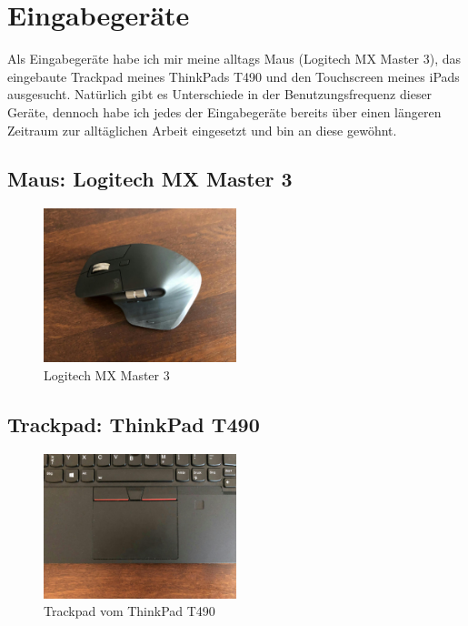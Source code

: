\documentclass{article}
\begin{document}
\newpage

\section{Eingabegeräte}

Als Eingabegeräte habe ich mir meine alltags Maus (Logitech MX Master 3), das
eingebaute Trackpad meines ThinkPads T490 und den Touchscreen meines iPads
ausgesucht. Natürlich gibt es Unterschiede in der Benutzungsfrequenz dieser
Geräte, dennoch habe ich jedes der Eingabegeräte bereits über einen längeren
Zeitraum zur alltäglichen Arbeit eingesetzt und bin an diese gewöhnt.

\subsection{Maus: Logitech MX Master 3}

\begin{figure}[h!]
	\centering
	\includegraphics[width=0.5\textwidth]{maus.jpg}
	\caption{Logitech MX Master 3}
\end{figure}

\subsection{Trackpad: ThinkPad T490}

\begin{figure}[h!]
	\centering
	\includegraphics[width=0.5\textwidth]{trackpad}
	\caption{Trackpad vom ThinkPad T490}
\end{figure}
\end{document}
